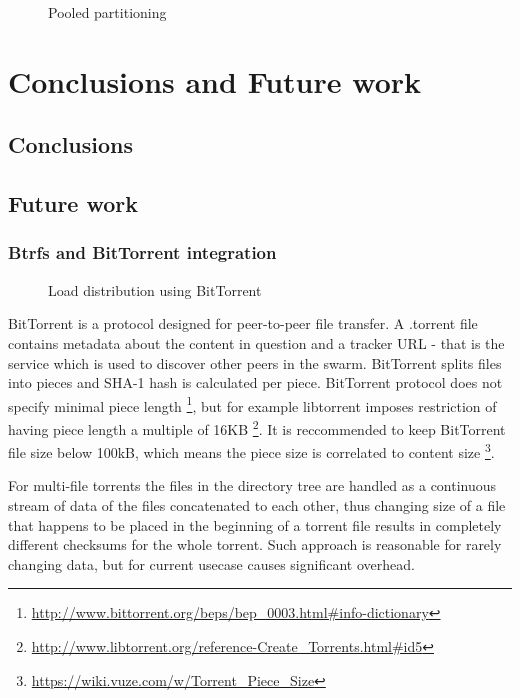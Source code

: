 \documentclass{article}
\begin{document}
\begin{figure}[!htb]
\centering
\scalebox{0.5}{}
\caption{Pooled partitioning}
\label{fig:digraph}
\end{figure}




\chapter{Conclusions and Future work}

\section{Conclusions}



\section{Future work}

\subsection{Btrfs and BitTorrent integration}


\begin{figure}[!htb]
\centering
\scalebox{0.5}{}
\caption{Load distribution using BitTorrent}
\label{fig:digraph}
\end{figure}

BitTorrent is a protocol designed for peer-to-peer file transfer.
A .torrent file contains metadata about the content in question and a
tracker URL - that is the service which is used to discover other peers in the swarm.
BitTorrent splits files into pieces and SHA-1 hash is calculated per piece.
BitTorrent protocol does not specify minimal piece length
\footnote{\url{http://www.bittorrent.org/beps/bep_0003.html#info-dictionary}},
but for example libtorrent imposes restriction of having piece length
a multiple of 16KB
\footnote{\url{http://www.libtorrent.org/reference-Create_Torrents.html#id5}}.
It is reccommended to keep BitTorrent file size below 100kB,
which means the piece size is correlated to content size
\footnote{\url{https://wiki.vuze.com/w/Torrent_Piece_Size}}.

For multi-file torrents the files in the directory tree are handled
as a continuous stream of data of the files concatenated to each other,
thus changing size of a file that happens to be placed in the beginning of a torrent
file results in completely different checksums for the whole torrent.
Such approach is reasonable for rarely changing data, but for current usecase
causes significant overhead.
\end{document}
